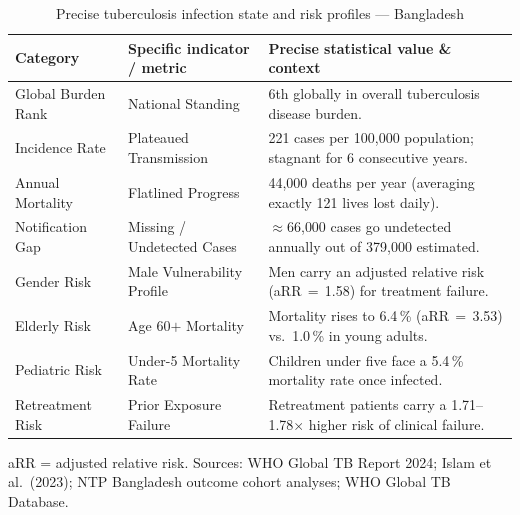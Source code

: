 \begin{table}[htbp]
\centering
\caption{Precise tuberculosis infection state and risk profiles --- Bangladesh}
\label{tab:risk_profiles}
\small
\begin{tabular}{p{3.2cm}p{4.5cm}p{7.0cm}}
\toprule
\textbf{Category} & \textbf{Specific indicator / metric} & \textbf{Precise statistical value \& context} \\
\midrule
Global Burden Rank & National Standing & 6th globally in overall tuberculosis disease burden. \\[3pt]
Incidence Rate & Plateaued Transmission & 221 cases per 100{,}000 population; stagnant for 6 consecutive years. \\[3pt]
Annual Mortality & Flatlined Progress & 44{,}000 deaths per year (averaging exactly 121 lives lost daily). \\[3pt]
Notification Gap & Missing / Undetected Cases & $\approx$66{,}000 cases go undetected annually out of 379{,}000 estimated. \\[3pt]
Gender Risk & Male Vulnerability Profile & Men carry an adjusted relative risk (aRR\,$=$\,1.58) for treatment failure. \\[3pt]
Elderly Risk & Age 60$+$ Mortality & Mortality rises to 6.4\,\% (aRR\,$=$\,3.53) vs.\ 1.0\,\% in young adults. \\[3pt]
Pediatric Risk & Under-5 Mortality Rate & Children under five face a 5.4\,\% mortality rate once infected. \\[3pt]
Retreatment Risk & Prior Exposure Failure & Retreatment patients carry a 1.71--1.78$\times$ higher risk of clinical failure. \\[3pt]
\bottomrule
\end{tabular}
\par\smallskip
\raggedright\footnotesize aRR = adjusted relative risk. Sources: WHO Global TB Report 2024; Islam et al.\ (2023); NTP Bangladesh outcome cohort analyses; WHO Global TB Database.
\end{table}